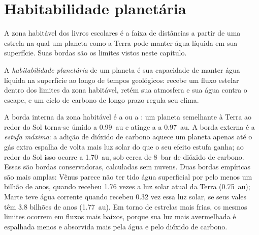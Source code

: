 \section{Habitabilidade planetária}\label{sec:b3:planetary-atmospheres:habitability}

A zona habitável dos livros escolares é a faixa de distâncias a partir de uma
estrela na qual um planeta como a Terra pode manter água líquida em sua
superfície. Suas bordas são os limites vistos neste capítulo.

\begin{definition}\label{def:b3:planetary-atmospheres:habitability}
A \emph{habitabilidade planetária} de um
planeta é sua capacidade de manter água líquida na superfície ao longo de
tempos geológicos: recebe um fluxo estelar dentro dos limites da
zona habitável, retém sua atmosfera e sua água contra o
escape, e um ciclo de carbono de longo prazo regula seu clima.
\end{definition}

A borda interna da zona habitável é a  ou a : um planeta semelhante à Terra ao redor do Sol torna-se úmido a
\qty{0.99}{au} e atinge a  a \qty{0.97}{au}. A borda externa é a
\emph{estufa máxima}: a adição de dióxido de carbono aquece um planeta apenas até
o gás extra espalha de volta mais luz solar do que o seu efeito estufa
ganha; ao redor do Sol isso ocorre a
\qty{1.70}{au}, sob cerca de \qty{8}{bar} de dióxido de carbono. Essas são
bordas conservadoras, calculadas sem nuvens. Duas bordas empíricas são mais amplas:
Vênus parece não ter tido água superficial por pelo menos um bilhão de anos,
quando recebeu 1.76 vezes a luz solar atual da Terra (\qty{0.75}{au});
Marte teve água corrente quando recebeu 0.32 vez essa luz solar, se seus
vales têm 3.8 bilhões de anos (\qty{1.77}{au}). Em torno de estrelas mais frias, os mesmos limites ocorrem
em fluxos mais baixos, porque sua luz mais avermelhada é espalhada menos e absorvida
mais pela água e pelo dióxido de carbono.


